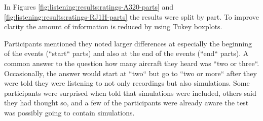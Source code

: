 %
%
%

In Figures \ref{fig:listening:results:ratings-A320-parts} and
\ref{fig:listening:results:ratings-RJ1H-parts} the results were split by part.
To improve clarity the amount of information is reduced by using Tukey boxplots.

Participants mentioned they noted larger differences at especially the beginning
of the events (``start`` parts) and also at the end of the events (``end`` parts). A
common answer to the question how many aircraft they heard was ``two or three``.
Occasionally, the answer would start at ``two`` but go to ``two or more`` after they
were told they were listening to not only recordings but also simulations. Some
participants were surprised when told that simulations were included,
others said they had thought so, and a few of the participants were already
aware the test was possibly going to contain simulations.

\newpage
{}

